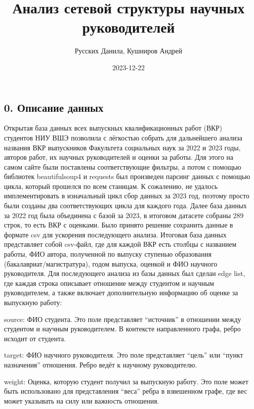 \documentclass[
]{article}
\title{Анализ сетевой структуры научных руководителей}
\author{Русских Данила, Кушниров Андрей}
\date{2023-12-22}
\begin{document}
\maketitle

\hypertarget{ux43eux43fux438ux441ux430ux43dux438ux435-ux434ux430ux43dux43dux44bux445}{%
\subsection{0. Описание
данных}\label{ux43eux43fux438ux441ux430ux43dux438ux435-ux434ux430ux43dux43dux44bux445}}

Открытая база данных всех выпускных квалификационных работ (ВКР)
студентов НИУ ВШЭ позволила с лёгкостью собрать для дальнейшего анализа
названия ВКР выпускников Факультета социальных наук за 2022 и 2023 годы,
авторов работ, их научных руководителей и оценки за работы. Для этого на
самом сайте были поставлены соответствующие фильтры, а потом с помощью
библиотек beautifulsoup4 и requests был произведен парсинг данных с
помощью цикла, который прошелся по всем станицам. К сожалению, не
удалось имплементировать в изначальный цикл сбор данных за 2023 год,
поэтому просто были созданы два соответствующих цикла для каждого года.
Далее база данных за 2022 год была объединена с базой за 2023, в
итоговом датасете собраны 289 строк, то есть ВКР с оценками. Было
принято решение сохранить данные в формате csv для ускорения
последующего анализа. Итоговая база данных представляет собой csv-файл,
где для каждой ВКР есть столбцы с названием работы, ФИО автора,
полученной по выпуску ступенью образования (бакалавриат/магистратура),
годом выпуска, оценкой и ФИО научного руководителя. Для последующего
анализа из базы данных был сделан edge list, где каждая строка описывает
отношение между студентом и научным руководителем, а также включает
дополнительную информацию об оценке за выпускную работу:

source: ФИО студента. Это поле представляет ``источник'' в отношении
между студентом и научным руководителем. В контексте направленного
графа, ребро исходит от студента.

target: ФИО научного руководителя. Это поле представляет ``цель'' или
``пункт назначения'' отношения. Ребро ведёт к научному руководителю.

weight: Оценка, которую студент получил за выпускную работу. Это поле
может быть использовано для представления ``веса'' ребра в взвешенном
графе, где вес может указывать на силу или важность отношения.
\end{document}
